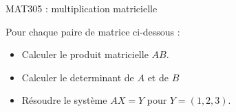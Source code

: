 \documentclass{article}
\begin{document}
\begin{center}
{\Large MAT305 : multiplication matricielle}\\
\end{center}

\vspace{.5in}
\hline
\vspace{.2in}
Pour chaque paire de matrice ci-dessous : 

\begin{itemize}
\item	Calculer le produit matricielle $AB$.
\item Calculer le determinant de $A$ et de $B$
\item Résoudre le système $AX= Y$
	pour $Y=(1,2,3)$.
\end{itemize}

\hline

\vspace{1in}
\end{document}
